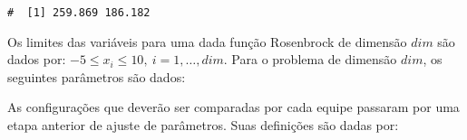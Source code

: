 \documentclass[11pt,twoside,printwatermark=false]{pinp}
\begin{document}
\begin{ShadedResult}
\begin{verbatim}
#  [1] 259.869 186.182
\end{verbatim}
\end{ShadedResult}

Os limites das variáveis para uma dada função Rosenbrock de dimensão
\(dim\) são dados por: \(-5\leq x_i\leq 10,~i=1,\dotsc,dim\). Para o
problema de dimensão \(dim\), os seguintes parâmetros são dados:

\begin{Shaded}
\begin{Highlighting}[]
\StringTok{ }

\StringTok{ }\NormalTok{(} \NormalTok{)}
\StringTok{ }\NormalTok{(} \NormalTok{, }  \OperatorTok{*}\StringTok{ }  \OperatorTok{*}\StringTok{ }
\StringTok{ }\NormalTok{(} \NormalTok{, } \NormalTok{(}\OperatorTok{-} \NormalTok{(}
\StringTok{ } \OperatorTok{*}\StringTok{ }
\end{Highlighting}
\end{Shaded}

\newpage

As configurações que deverão ser comparadas por cada equipe passaram por
uma etapa anterior de ajuste de parâmetros. Suas definições são dadas
por:

\begin{Shaded}
\begin{Highlighting}[]

\StringTok{ }\NormalTok{(} \NormalTok{) }
\StringTok{ }\NormalTok{(} \NormalTok{, } \NormalTok{)}

\StringTok{ }\NormalTok{(} \NormalTok{, } \NormalTok{) }
\StringTok{ }\NormalTok{(} \NormalTok{, } \NormalTok{)}
\end{Highlighting}
\end{Shaded}
\end{document}

